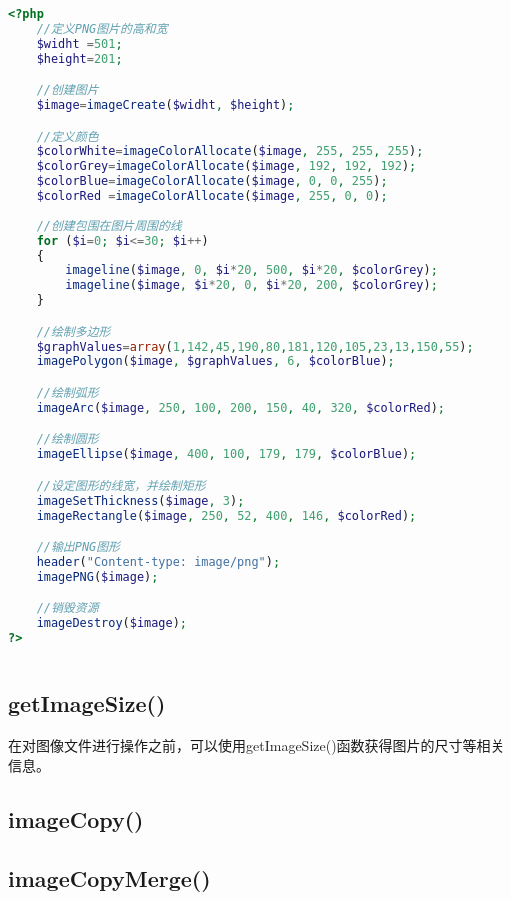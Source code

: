 \begin{lstlisting}[language=PHP]
<?php
	//定义PNG图片的高和宽
	$widht =501;
	$height=201;

	//创建图片
	$image=imageCreate($widht, $height);

	//定义颜色
	$colorWhite=imageColorAllocate($image, 255, 255, 255);
	$colorGrey=imageColorAllocate($image, 192, 192, 192);
	$colorBlue=imageColorAllocate($image, 0, 0, 255);
	$colorRed =imageColorAllocate($image, 255, 0, 0);
	
	//创建包围在图片周围的线
	for ($i=0; $i<=30; $i++)
	{
		imageline($image, 0, $i*20, 500, $i*20, $colorGrey);
		imageline($image, $i*20, 0, $i*20, 200, $colorGrey);
	}

	//绘制多边形
	$graphValues=array(1,142,45,190,80,181,120,105,23,13,150,55);
	imagePolygon($image, $graphValues, 6, $colorBlue);

	//绘制弧形
	imageArc($image, 250, 100, 200, 150, 40, 320, $colorRed);

	//绘制圆形
	imageEllipse($image, 400, 100, 179, 179, $colorBlue);

	//设定图形的线宽，并绘制矩形
	imageSetThickness($image, 3);
	imageRectangle($image, 250, 52, 400, 146, $colorRed);

	//输出PNG图形
	header("Content-type: image/png");
	imagePNG($image);

	//销毁资源
	imageDestroy($image);
?>
\end{lstlisting}




\begin{lstlisting}[language=PHP]

\end{lstlisting}



\subsection{getImageSize()}


在对图像文件进行操作之前，可以使用getImageSize()函数获得图片的尺寸等相关信息。




\subsection{imageCopy()}





\subsection{imageCopyMerge()}




